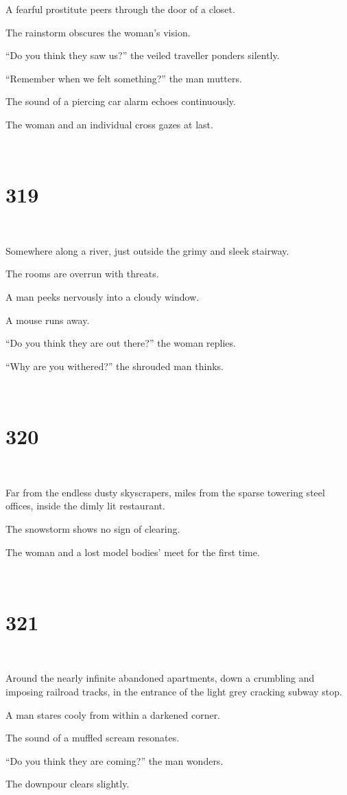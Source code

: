 \documentclass{report}
\begin{document}
A fearful prostitute peers through the door of a closet.

The rainstorm obscures the woman's vision.

``Do you think they saw us?'' the veiled traveller ponders silently.

``Remember when we felt something?'' the man mutters.

The sound of a piercing car alarm echoes continuously.

The woman and an individual cross gazes at last.

~
\chapter*{319}
~

Somewhere along a river, just outside the grimy and sleek stairway.

The rooms are overrun with threats.

A man peeks nervously into a cloudy window.

A mouse runs away.

``Do you think they are out there?'' the woman replies.

``Why are you withered?'' the shrouded man thinks.

~
\chapter*{320}
~

Far from the endless dusty skyscrapers, miles from the sparse towering steel offices, inside the dimly lit restaurant.

The snowstorm shows no sign of clearing.

The woman and a lost model bodies' meet for the first time.

~
\chapter*{321}
~

Around the nearly infinite abandoned apartments, down a crumbling and imposing railroad tracks, in the entrance of the light grey cracking subway stop.

A man stares cooly from within a darkened corner.

The sound of a muffled scream resonates.

``Do you think they are coming?'' the man wonders.

The downpour clears slightly.
\end{document}
